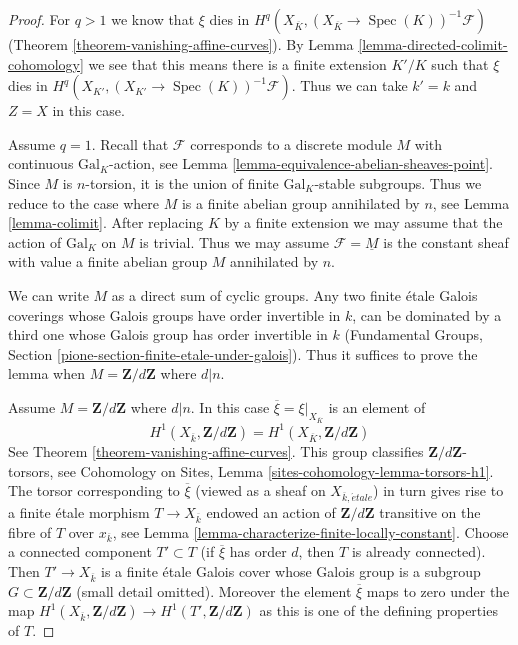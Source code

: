 \documentclass[10pt,a4paper]{amsart}
\theoremstyle{plain}
\theoremstyle{definition}
\theoremstyle{remark}
\numberwithin{equation}{subsection}
\def\Spec{\mathop{\mathrm{Spec}}}
\def\etale{{\acute{e}tale}}
\begin{document}
\begin{proof}
For $q > 1$ we know that $\xi$ dies in
$H^q(X_{\overline{K}}, (X_{\overline{K}} \to \Spec(K))^{-1}\mathcal{F})$
(Theorem \ref{theorem-vanishing-affine-curves}).
By Lemma \ref{lemma-directed-colimit-cohomology} we see that
this means there is a finite extension $K'/K$ such that
$\xi$ dies in $H^q(X_{K'}, (X_{K'} \to \Spec(K))^{-1}\mathcal{F})$.
Thus we can take $k' = k$ and $Z = X$ in this case.

\medskip\noindent
Assume $q = 1$. Recall that $\mathcal{F}$ corresponds to a
discrete module $M$ with continuous $\text{Gal}_K$-action, see
Lemma \ref{lemma-equivalence-abelian-sheaves-point}.
Since $M$ is $n$-torsion, it is the union of finite
$\text{Gal}_K$-stable subgroups. Thus
we reduce to the case where $M$ is a finite abelian group annihilated by $n$,
see Lemma \ref{lemma-colimit}. After replacing $K$ by a finite extension
we may assume that the action of $\text{Gal}_K$ on $M$ is trivial.
Thus we may assume $\mathcal{F} = \underline{M}$ is the constant
sheaf with value a finite abelian group $M$ annihilated by $n$.

\medskip\noindent
We can write $M$ as a direct sum of cyclic groups.
Any two finite \'etale Galois coverings whose Galois groups
have order invertible in $k$, can be dominated by a third one whose
Galois group has order invertible in $k$
(Fundamental Groups, Section \ref{pione-section-finite-etale-under-galois}).
Thus it suffices to prove the lemma when
$M = \mathbf{Z}/d\mathbf{Z}$ where $d | n$.

\medskip\noindent
Assume $M = \mathbf{Z}/d\mathbf{Z}$ where $d | n$.
In this case $\overline{\xi} = \xi|_{X_{\overline{K}}}$ is an element of
$$
H^1(X_{\overline{k}}, \mathbf{Z}/d\mathbf{Z}) =
H^1(X_{\overline{K}}, \mathbf{Z}/d\mathbf{Z})
$$
See Theorem \ref{theorem-vanishing-affine-curves}.
This group classifies $\mathbf{Z}/d\mathbf{Z}$-torsors, see
Cohomology on Sites, Lemma \ref{sites-cohomology-lemma-torsors-h1}.
The torsor corresponding to $\overline{\xi}$ (viewed as a sheaf on
$X_{\overline{k}, \etale}$) in turn gives rise to a finite \'etale morphism
$T \to X_{\overline{k}}$ endowed an action of $\mathbf{Z}/d\mathbf{Z}$
transitive on the fibre of $T$ over $x_{\overline{k}}$, see
Lemma \ref{lemma-characterize-finite-locally-constant}.
Choose a connected component $T' \subset T$ (if $\overline{\xi}$ has
order $d$, then $T$ is already connected).
Then $T' \to X_{\overline{k}}$ is a finite \'etale Galois
cover whose Galois group is a subgroup $G \subset \mathbf{Z}/d\mathbf{Z}$
(small detail omitted). Moreover the element $\overline{\xi}$ maps to zero
under the map $H^1(X_{\overline{k}}, \mathbf{Z}/d\mathbf{Z}) \to
H^1(T', \mathbf{Z}/d\mathbf{Z})$ as this is one
of the defining properties of $T$.


\end{proof}
\end{document}
